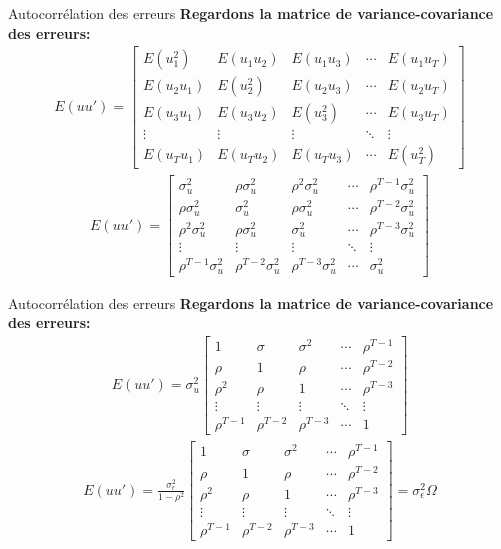 \documentclass{beamer}
\begin{document}
\begin{frame}{Autocorrélation des erreurs}
\textbf{Regardons la matrice de variance-covariance des erreurs:}
\begin{align*}
E(uu')=\begin{bmatrix}
E(u_1^2) & E(u_1u_2) & E(u_1u_3) & \cdots & E(u_1u_T)\\
E(u_2u_1) & E(u_2^2) & E(u_2u_3) & \cdots & E(u_2u_T)\\
E(u_3u_1) & E(u_3u_2) & E(u_3^2) & \cdots & E(u_3u_T)\\
\vdots & \vdots & \vdots & \ddots & \vdots \\
E(u_Tu_1) & E(u_Tu_2) & E(u_Tu_3) & \cdots & E(u_T^2)
\end{bmatrix}
\end{align*}
\begin{align*}
E(uu')=\begin{bmatrix}
\sigma_u^2 & \rho \sigma_u^2 & \rho^2 \sigma_u^2 & \cdots & \rho^{T-1} \sigma_u^2 \\
\rho \sigma_u^2 & \sigma_u^2 & \rho \sigma_u^2 & \cdots & \rho^{T-2} \sigma_u^2 \\
\rho^2 \sigma_u^2 & \rho \sigma_u^2 & \sigma_u^2 & \cdots & \rho^{T-3} \sigma_u^2 \\
\vdots & \vdots & \vdots & \ddots & \vdots \\
\rho^{T-1} \sigma_u^2 & \rho^{T-2} \sigma_u^2 & \rho^{T-3} \sigma_u^2 & \cdots & \sigma_u^2
\end{bmatrix}
\end{align*}
\end{frame}


\begin{frame}{Autocorrélation des erreurs}
\textbf{Regardons la matrice de variance-covariance des erreurs:}
\begin{align*}
E(uu')=\sigma_u^2\begin{bmatrix}
1 & \sigma & \sigma^2 & \cdots & \rho^{T-1}\\
\rho & 1 & \rho & \cdots & \rho^{T-2} \\
\rho^2 & \rho & 1 & \cdots & \rho^{T-3} \\
\vdots & \vdots & \vdots & \ddots & \vdots\\
\rho^{T-1} & \rho^{T-2} & \rho^{T-3} & \cdots & 1
\end{bmatrix}
\end{align*}
\begin{align*}
E(uu')= \frac{\sigma_{\epsilon}^2}{1-\rho^2} \begin{bmatrix}
1 & \sigma & \sigma^2 & \cdots & \rho^{T-1}\\
\rho & 1 & \rho & \cdots & \rho^{T-2} \\
\rho^2 & \rho & 1 & \cdots & \rho^{T-3} \\
\vdots & \vdots & \vdots & \ddots & \vdots\\
\rho^{T-1} & \rho^{T-2} & \rho^{T-3} & \cdots & 1
\end{bmatrix}=\sigma_{\epsilon}^2 \Omega
\end{align*}
\end{frame}
\end{document}
